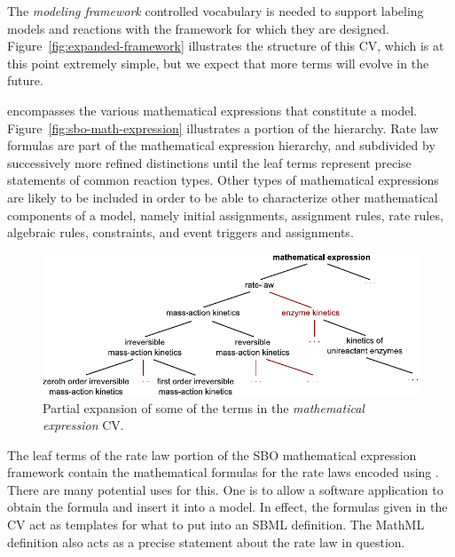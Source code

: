 The \emph{modeling framework} controlled vocabulary is needed to
support labeling models and reactions with the framework for which
they are designed.  Figure~\vref{fig:expanded-framework}
illustrates the structure of this CV, which is at this point
extremely simple, but we expect that more terms will evolve in the
future.

 encompasses the
various mathematical expressions that constitute a model.
Figure~\vref{fig:sbo-math-expression} illustrates a portion of the
hierarchy.  Rate law formulas are part of the mathematical
expression hierarchy, and subdivided by successively more refined
distinctions until the leaf terms represent precise statements of
common reaction types.  Other types of mathematical expressions
are likely to be included  in order to be
able to characterize other mathematical components of a model,
namely initial assignments, assignment rules, rate rules,
algebraic rules, constraints, and event triggers and assignments.

\begin{figure}[tbh]
  \centering
  \includegraphics[scale = 0.9]{figs/sbo-math-expression}
  \caption{Partial expansion of some of the terms in the \emph{mathematical
      expression} CV.}
  \label{fig:sbo-math-expression}
\end{figure}

The leaf terms of the rate law portion of the SBO mathematical
expression framework contain the mathematical formulas for the
rate laws encoded using \mathmltwo.  There are many potential uses
for this.  One is to allow a software application to obtain the
formula and insert it into a model.  In effect, the formulas given
in the CV act as templates for what to put into an SBML
\KineticLaw definition.  The MathML definition also acts as a
precise statement about the rate law in question.     

